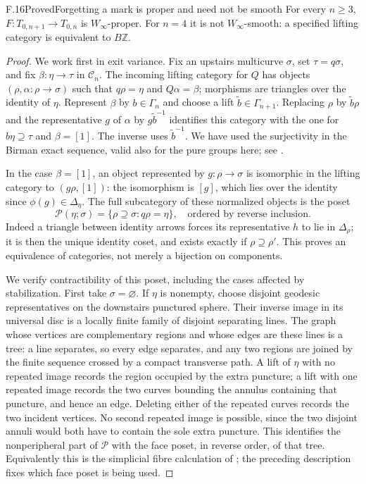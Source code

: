\begin{claim}{F.16}{Proved}{Forgetting a mark is proper and need not be smooth}
For every $n\geq3$, $F:T_{0,n+1}\to T_{0,n}$ is $W_\infty$-proper. For $n=4$ it is not $W_\infty$-smooth: a specified lifting category is equivalent to $B\mathbb Z$.
\end{claim}
\begin{proof}
We work first in exit variance. Fix an upstairs multicurve $\sigma$, set $\tau=q\sigma$, and fix $\beta:\eta\to\tau$ in $\mathcal C_n$. The incoming lifting category for $Q$ has objects $(\rho,\alpha:\rho\to\sigma)$ such that $q\rho=\eta$ and $Q\alpha=\beta$; morphisms are triangles over the identity of $\eta$. Represent $\beta$ by $b\in\Gamma_n$ and choose a lift $\widetilde b\in\Gamma_{n+1}$. Replacing $\rho$ by $\widetilde b\rho$ and the representative $g$ of $\alpha$ by $g\widetilde b^{-1}$ identifies this category with the one for $b\eta\supseteq\tau$ and $\beta=[1]$. The inverse uses $\widetilde b^{-1}$. We have used the surjectivity in the Birman exact sequence, valid also for the pure groups here; see \citet[Section 2]{EFKentLeiningerSchleimer2009}.

In the case $\beta=[1]$, an object represented by $g:\rho\to\sigma$ is isomorphic in the lifting category to $(g\rho,[1])$: the isomorphism is $[g]$, which lies over the identity since $\phi(g)\in\Delta_\eta$. The full subcategory of these normalized objects is the poset
\[
 \mathcal P(\eta;\sigma)=\{\rho\supseteq\sigma:q\rho=\eta\},
 \quad\text{ordered by reverse inclusion}.
\]
Indeed a triangle between identity arrows forces its representative $h$ to lie in $\Delta_\rho$; it is then the unique identity coset, and exists exactly if $\rho\supseteq\rho'$. This proves an equivalence of categories, not merely a bijection on components.

We verify contractibility of this poset, including the cases affected by stabilization. First take $\sigma=\varnothing$. If $\eta$ is nonempty, choose disjoint geodesic representatives on the downstairs punctured sphere. Their inverse image in its universal disc is a locally finite family of disjoint separating lines. The graph whose vertices are complementary regions and whose edges are these lines is a tree: a line separates, so every edge separates, and any two regions are joined by the finite sequence crossed by a compact transverse path. A lift of $\eta$ with no repeated image records the region occupied by the extra puncture; a lift with one repeated image records the two curves bounding the annulus containing that puncture, and hence an edge. Deleting either of the repeated curves records the two incident vertices. No second repeated image is possible, since the two disjoint annuli would both have to contain the sole extra puncture. This identifies the nonperipheral part of $\mathcal P$ with the face poset, in reverse order, of that tree. Equivalently this is the simplicial fibre calculation of \citet[Theorem 7.1]{EFKentLeiningerSchleimer2009}; the preceding description fixes which face poset is being used.


\end{proof}
